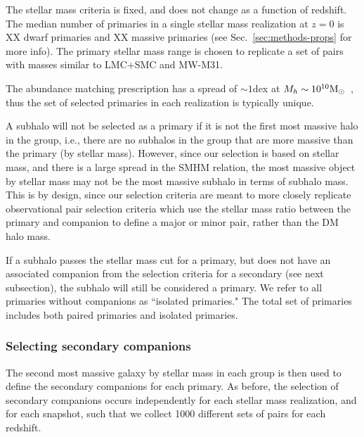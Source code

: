 \documentclass[twocolumn]{aastex631}
\begin{document}
    The stellar mass criteria is fixed, and does not change as a function of redshift. 
    The median number of primaries in a single stellar mass realization at $z=0$ is XX dwarf primaries and XX massive primaries (see Sec.~\ref{sec:methods-props} for more info). 
    The primary stellar mass range is chosen to replicate a set of pairs with masses similar to LMC+SMC and MW-M31. 
    
    The abundance matching prescription has a spread of $\sim 1$dex at $M_{h}\sim 10^{10}\mathrm{M}_\odot$~\citep{Moster2013}, thus the set of selected primaries in each realization is typically unique. 

    A subhalo will not be selected as a primary if it is not the first most massive halo in the group, i.e., there are no subhalos in the group that are more massive than the primary (by stellar mass). However, since our selection is based on stellar mass, and there is a large spread in the SMHM relation, the most massive object by stellar mass may not be the most massive subhalo in terms of subhalo mass. 
    This is by design, since our selection criteria are meant to more closely replicate observational pair selection criteria which use the stellar mass ratio between the primary and companion to define a major or minor pair, rather than the DM halo mass. 

    If a subhalo passes the stellar mass cut for a primary, but does not have an associated companion from the selection criteria for a secondary (see next subsection), the subhalo will still be considered a primary. We refer to all primaries without companions as ``isolated primaries."
    The total set of primaries includes both paired primaries and isolated primaries.
    
    \subsubsection{Selecting secondary companions}
    The second most massive galaxy by stellar mass in each group is then used to define the secondary companions for each primary. 
    As before, the selection of secondary companions occurs independently for each stellar mass realization, and for each snapshot, such that we collect 1000 different sets of pairs for each redshift.
    
\end{document}

